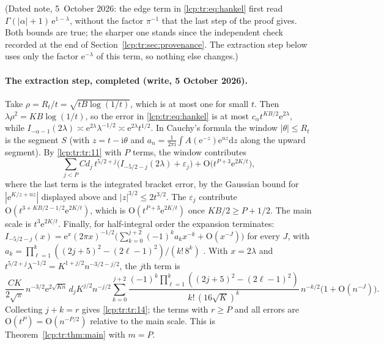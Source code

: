 \documentclass[11pt]{article}
\numberwithin{equation}{section}
\theoremstyle{definition}\newtheorem{definition}[theorem]{Definition}
\theoremstyle{remark}\newtheorem{remark}[theorem]{Remark}
\newcommand{\OO}{\mathrm O}
\newcommand{\ee}{\mathrm e}
\newcommand{\ii}{\mathrm i}%
\newcommand{\dd}{\mathrm d}%
\begin{document}
\noindent(Dated note, 5~October 2026: the edge term in
\eqref{lcp:tr:eq:hankel} first read $\Gamma(|\alpha|+1)\,\ee^{1-\lambda}$,
without the factor $\pi^{-1}$ that the last step of the proof gives. Both
bounds are true; the sharper one stands since the independent check
recorded at the end of Section~\ref{lcp:tr:sec:provenance}. The extraction
step below uses only the factor $\ee^{-\lambda}$ of this term, so nothing
else changes.)

\paragraph{The extraction step, completed (write, 5 October 2026).}
Take $\rho=R_t/t=\sqrt{tB\log(1/t)}$, which is at most one for small $t$.
Then $\lambda\rho^2=KB\log(1/t)$, so the error in \eqref{lcp:tr:eq:hankel}
is at most $c_\alpha t^{KB/2}\ee^{2\lambda}$, while
$I_{-\alpha-1}(2\lambda)\asymp\ee^{2\lambda}\lambda^{-1/2}\asymp\ee^{2\lambda}t^{1/2}$.
In Cauchy's formula the window $|\theta|\le R_t$ is the segment $S$
(with $z=t-\ii\theta$ and $a_n=\frac1{2\pi\ii}\int A(\ee^{-z})\ee^{nz}\dd z$
along the upward segment). By \eqref{lcp:tr:tr:11} with $P$ terms, the
window contributes
\[
 \sum_{j<P}Cd_j\,t^{5/2+j}\bigl(I_{-5/2-j}(2\lambda)+\varepsilon_j\bigr)
 +\OO\bigl(t^{P+3}\ee^{2K/t}\bigr),
\]
where the last term is the integrated bracket error, by the Gaussian bound
for $|\ee^{K/z+nz}|$ displayed above and $|z|^{3/2}\le2t^{3/2}$. The
$\varepsilon_j$ contribute $\OO(t^{3+KB/2-1/2}\ee^{2K/t})$, which is
$\OO(t^{P+3}\ee^{2K/t})$ once $KB/2\ge P+1/2$. The main scale is
$t^3\ee^{2K/t}$. Finally, for half-integral order the expansion
\cite[10.40.1]{lcp-tr-dlmf} terminates:
$I_{-5/2-j}(x)=\ee^x(2\pi x)^{-1/2}\bigl(\sum_{k=0}^{j+2}(-1)^ka_k x^{-k}+\OO(x^{-J})\bigr)$
for every $J$, with $a_k=\prod_{\ell=1}^k((2j+5)^2-(2\ell-1)^2)/(k!\,8^k)$
\cite[10.17.1]{lcp-tr-dlmf}. With $x=2\lambda$ and
$t^{5/2+j}\lambda^{-1/2}=K^{1+j/2}n^{-3/2-j/2}$, the $j$th term is
\[
 \frac{CK}{2\sqrt\pi}\,n^{-3/2}\ee^{2\sqrt{Kn}}\,d_jK^{j/2}n^{-j/2}
 \sum_{k=0}^{j+2}\frac{(-1)^k\prod_{\ell=1}^k((2j+5)^2-(2\ell-1)^2)}{k!\,(16\sqrt K)^k}\,n^{-k/2}
 \bigl(1+\OO(n^{-J})\bigr).
\]
Collecting $j+k=r$ gives \eqref{lcp:tr:tr:14}; the terms with $r\ge P$ and
all errors are $\OO(t^P)=\OO(n^{-P/2})$ relative to the main scale. This is
Theorem~\ref{lcp:tr:thm:main} with $m=P$.



\end{document}
